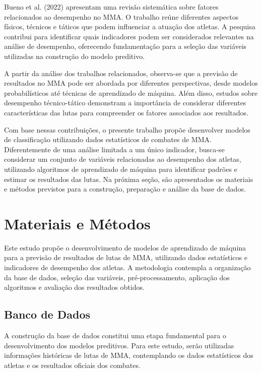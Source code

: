 \documentclass[12pt,a4paper]{report}
\begin{document}
Bueno et al. (2022) apresentam uma revisão sistemática sobre fatores relacionados ao desempenho no MMA. O trabalho reúne diferentes aspectos físicos, técnicos e táticos que podem influenciar a atuação dos atletas. A pesquisa contribui para identificar quais indicadores podem ser considerados relevantes na análise de desempenho, oferecendo fundamentação para a seleção das variáveis utilizadas na construção do modelo preditivo.

A partir da análise dos trabalhos relacionados, observa-se que a previsão de resultados no MMA pode ser abordada por diferentes perspectivas, desde modelos probabilísticos até técnicas de aprendizado de máquina. Além disso, estudos sobre desempenho técnico-tático demonstram a importância de considerar diferentes características das lutas para compreender os fatores associados aos resultados.

Com base nessas contribuições, o presente trabalho propõe desenvolver modelos de classificação utilizando dados estatísticos de combates de MMA. Diferentemente de uma análise limitada a um único indicador, busca-se considerar um conjunto de variáveis relacionadas ao desempenho dos atletas, utilizando algoritmos de aprendizado de máquina para identificar padrões e estimar os resultados das lutas. Na próxima seção, são apresentados os materiais e métodos previstos para a construção, preparação e análise da base de dados.

\chapter{Materiais e Métodos}

Este estudo propõe o desenvolvimento de modelos de aprendizado de máquina para a previsão de resultados de lutas de MMA, utilizando dados estatísticos e indicadores de desempenho dos atletas. A metodologia contempla a organização da base de dados, seleção das variáveis, pré-processamento, aplicação dos algoritmos e avaliação dos resultados obtidos.

\section{Banco de Dados}

A construção da base de dados constitui uma etapa fundamental para o desenvolvimento dos modelos preditivos. Para este estudo, serão utilizadas informações históricas de lutas de MMA, contemplando os dados estatísticos dos atletas e os resultados oficiais dos combates.
\end{document}
